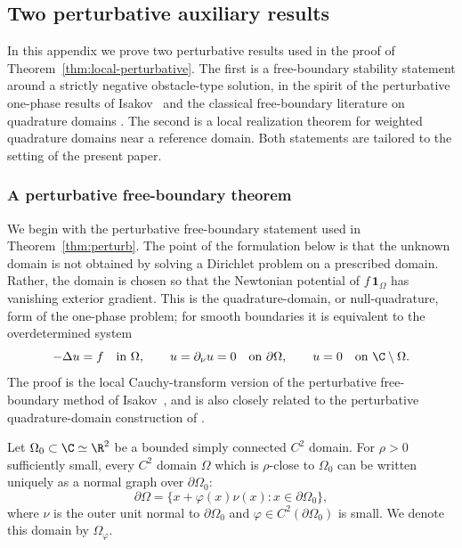 \subsection{Two perturbative auxiliary results}\label{app:auxiliary-results}

In this appendix we prove two perturbative results used in the proof of
Theorem~\ref{thm:local-perturbative}. The first is a free-boundary stability
statement around a strictly negative obstacle-type solution, in the spirit of
the perturbative one-phase results of Isakov~\cite[Chapter~5]{Isakov} and the
classical free-boundary literature on quadrature domains
\cite{Aharonov-Schiffer-Zalcman,Karp,Gustafsson,Shahgholian,Gustafsson-Shahgholian}.
The second is a local realization theorem for weighted quadrature domains near
a reference domain. Both statements are tailored to the setting of the present
paper.

\subsubsection{A perturbative free-boundary theorem}\label{app:isakov-type}

We begin with the perturbative free-boundary statement used in
Theorem~\ref{thm:perturb}. The point of the formulation below is that the
unknown domain is not obtained by solving a Dirichlet problem on a prescribed
domain. Rather, the domain is chosen so that the Newtonian potential of
\(f\,\mathbf 1_{\Omega}\) has vanishing exterior gradient. This is the
quadrature-domain, or null-quadrature, form of the one-phase problem; for
smooth boundaries it is equivalent to the overdetermined system
\[
-\Delta u=f \quad\text{in }\Omega,\qquad
u=\partial_\nu u=0 \quad\text{on }\partial\Omega,
\qquad
u=0 \quad\text{on }\C\setminus\Omega .
\]
The proof is the local Cauchy-transform version of the perturbative
free-boundary method of Isakov~\cite[Chapter~5]{Isakov}, and is also closely
related to the perturbative quadrature-domain construction of
\cite{Cherednichenko,Gustafsson,Gustafsson-Shahgholian,Shahgholian,Karp}.

Let \(\Omega_0\subset\C\simeq\R^2\) be a bounded simply connected \(C^2\)
domain. For \(\rho>0\) sufficiently small, every \(C^2\) domain \(\Omega\)
which is \(\rho\)-close to \(\Omega_0\) can be written uniquely as a normal
graph over \(\partial\Omega_0\):
\[
\partial\Omega
=
\{x+\varphi(x)\nu(x):x\in\partial\Omega_0\},
\]
where \(\nu\) is the outer unit normal to \(\partial\Omega_0\) and
\(\varphi\in C^2(\partial\Omega_0)\) is small. We denote this domain by
\(\Omega_\varphi\).

